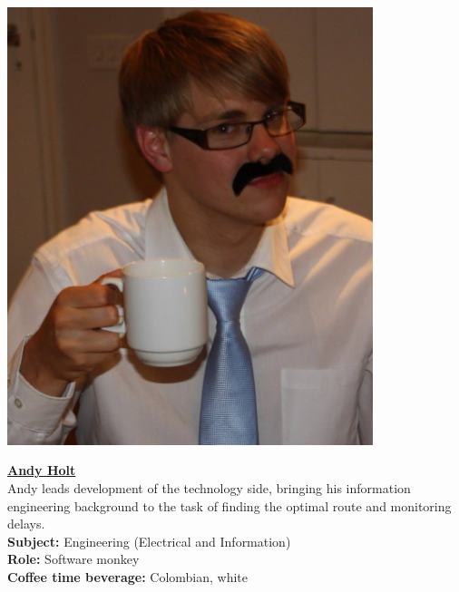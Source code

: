 \documentclass[a4paper,11pt]{article}  %
\begin{document}
\noindent \begin{minipage}{0.4\textwidth}
  \includegraphics[width=0.8\textwidth]{AndyProfile.jpg}
\end{minipage}
\hfill
\begin{minipage}{0.6\textwidth}
  {\large \textbf{\underline{Andy Holt}}}\\

  Andy leads development of the technology side, bringing
  his information engineering background to the task of finding the
  optimal route and monitoring delays.\\

  \textbf{Subject:} Engineering (Electrical and Information)\\
  \textbf{Role:} Software monkey\\
  \textbf{Coffee time beverage:} Colombian, white
\end{minipage}

\bigskip
\end{document}
